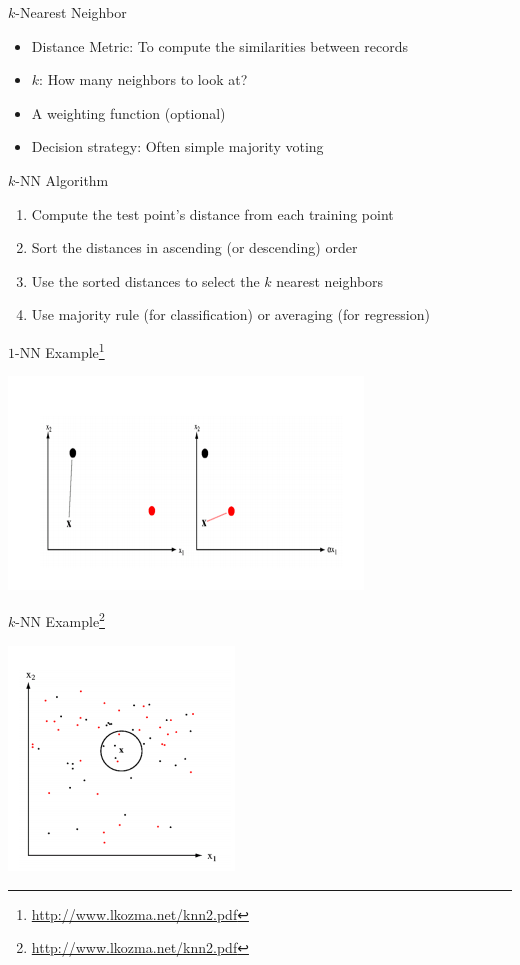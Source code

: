 \documentclass{beamer}
\newcommand{\furl}[1]{{\footnote{\url{#1}}}}
\begin{document}
\begin{frame}{$k$-Nearest Neighbor}
    \begin{itemize}
        \item Distance Metric: To compute the similarities between records 
        \item $k$: How many neighbors to look at?
        \item A weighting function (optional)
        \item Decision strategy: Often simple majority voting
    \end{itemize}
\end{frame}


\begin{frame}{$k$-NN Algorithm}
    \begin{enumerate}
        \item Compute the test point's distance from each training point
        \item Sort the distances in ascending (or descending) order
        \item Use the sorted distances to select the $k$ nearest neighbors
        \item Use majority rule (for classification) or averaging (for regression)
    \end{enumerate}
\end{frame}


\begin{frame}{$1$-NN Example\furl{http://www.lkozma.net/knn2.pdf}}
    \begin{center}
        \includegraphics[scale=0.75]{1NN.png}
    \end{center}
\end{frame}

\begin{frame}{$k$-NN Example\furl{http://www.lkozma.net/knn2.pdf}}
    \begin{center}
        \includegraphics[scale=0.75]{kNN.png}
    \end{center}
\end{frame}
\end{document}
